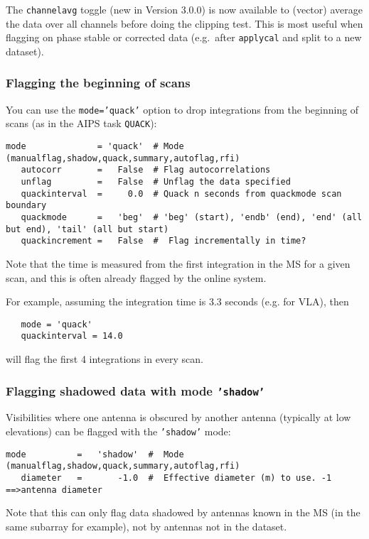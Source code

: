 The {\tt channelavg} toggle (new in Version 3.0.0) is now available
to (vector) average the data over all channels before doing the
clipping test.  This is most useful when flagging on phase stable or
corrected data (e.g.\ after {\tt applycal} and split to a new
dataset).

\subsubsection{Flagging the beginning of scans}
\label{section:edit.flagdata.quack}

You can use the {\tt mode='quack'} option to drop integrations from
the beginning of scans (as in the AIPS task {\tt QUACK}):
\small
\begin{verbatim}
mode              = 'quack'  # Mode (manualflag,shadow,quack,summary,autoflag,rfi)
   autocorr       =   False  # Flag autocorrelations
   unflag         =   False  # Unflag the data specified
   quackinterval  =     0.0  # Quack n seconds from quackmode scan boundary
   quackmode      =   'beg'  # 'beg' (start), 'endb' (end), 'end' (all but end), 'tail' (all but start)
   quackincrement =   False  #  Flag incrementally in time?
\end{verbatim}
\normalsize
Note that the time is measured from the first integration in the MS
for a given scan, and this is often already flagged by the online
system.

For example, assuming the integration time is 3.3 seconds (e.g. for
VLA), then
\small
\begin{verbatim}
   mode = 'quack'
   quackinterval = 14.0 
\end{verbatim}
\normalsize
will flag the first 4 integrations in every scan.

\subsubsection{Flagging shadowed data with mode {\tt 'shadow'} }
\label{section:edit.flagdata.shadow}

Visibilities where one antenna is obscured by another antenna
(typically at low elevations) can be flagged with the {\tt 'shadow'}
mode:
\small
\begin{verbatim}
mode          =   'shadow'  #  Mode (manualflag,shadow,quack,summary,autoflag,rfi)
   diameter   =       -1.0  #  Effective diameter (m) to use. -1 ==>antenna diameter
\end{verbatim}
\normalsize
Note that this can only flag data shadowed by antennas known in the MS
(in the same subarray for example), not by antennas not in the dataset.

